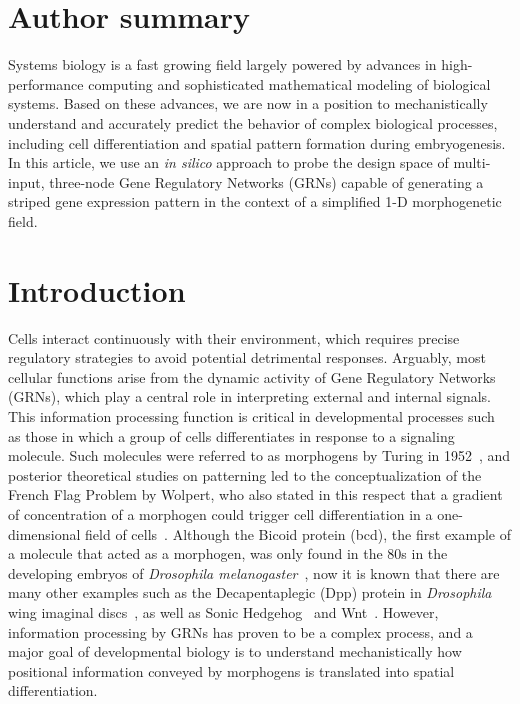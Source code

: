 \documentclass[10pt,letterpaper]{article}
\begin{document}
\section*{Author summary}
Systems biology is a fast growing field largely powered by advances in
high-performance computing and sophisticated mathematical modeling of
biological systems. Based on these advances, we are now in a position to
mechanistically understand and accurately predict the behavior of
complex biological processes, including cell differentiation and spatial pattern
formation during embryogenesis. In this article, we use an \textit{in silico}
approach to probe the design space of multi-input, three-node Gene Regulatory
Networks (GRNs) capable of generating a striped gene expression pattern in
the context of a simplified 1-D morphogenetic field.

\linenumbers

\section*{Introduction}

Cells interact continuously with their environment, which requires precise
regulatory strategies to avoid potential detrimental responses. Arguably, most
cellular functions arise from the dynamic activity of Gene Regulatory Networks
(GRNs), which play a central role in interpreting external and internal
signals. This information processing function is critical in
developmental processes such as those in which a group of cells differentiates in
response to a signaling molecule. Such molecules were referred to as morphogens by Turing in
1952~\cite{Turing1952}, and posterior theoretical studies on patterning led to the
conceptualization of the French Flag Problem by Wolpert, who also stated
in this respect that a gradient of concentration of a morphogen could
trigger cell differentiation in a one-dimensional field of cells~\cite{Wolpert1969,
sharpe_2019}.
Although the Bicoid protein (bcd), the first example of a molecule that acted
as a morphogen, was only found in the 80s in the developing embryos of
\textit{Drosophila melanogaster}~\cite{driever_gradient_1988,
driever_bicoid_1988}, now it is known that there
are many other examples such as the Decapentaplegic (Dpp) protein in
\textit{Drosophila} wing imaginal discs~\cite{affolter_decapentaplegic_2007},
as well as Sonic Hedgehog~\cite{dessaud_dynamic_2010,cohen_theoretical_2014}
and Wnt~\cite{raspopovic_digit_2014}. However, information processing by GRNs
has proven to be a complex process, and a major goal of developmental biology
is to understand mechanistically how positional information conveyed by morphogens
is translated into spatial differentiation.\\
\end{document}
